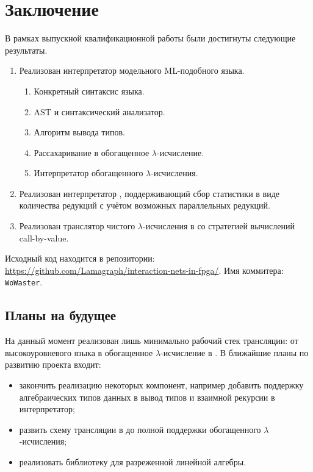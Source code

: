 
\section*{Заключение}

В рамках выпускной квалификационной работы были достигнуты следующие результаты.
\begin{enumerate}
      \item Реализован интерпретатор модельного ML-подобного языка.
            \begin{enumerate}
                  \item Конкретный синтаксис языка.
                  \item AST и синтаксический анализатор.
                  \item Алгоритм вывода типов.
                  \item Рассахаривание в обогащенное $\lambda$-исчисление.
                  \item Интерпретатор обогащенного $\lambda$-исчисления.
            \end{enumerate}
      \item Реализован интерпретатор \INs{}, поддерживающий сбор статистики в виде количества редукций с учётом возможных параллельных редукций.
      \item Реализован транслятор чистого $\lambda$-исчисления в \INs{} со стратегией вычислений call-by-value.
\end{enumerate}

Исходный код находится в репозитории: \url{https://github.com/Lamagraph/interaction-nets-in-fpga/}.
Имя коммитера: \texttt{WoWaster}.

\subsection*{Планы на будущее}

На данный момент реализован лишь минимально рабочий стек трансляции: от высокоуровневого языка в обогащенное $\lambda$-исчисление в \INs{}.
В ближайшие планы по развитию проекта входит:
\begin{itemize}
      \item закончить реализацию некоторых компонент, например добавить поддержку алгебраических типов данных в вывод типов и взаимной рекурсии в интерпретатор;
      \item развить схему трансляции в \INs{} до полной поддержки обогащенного $\lambda$-исчисления;
      \item реализовать библиотеку для разреженной линейной алгебры.
\end{itemize}
